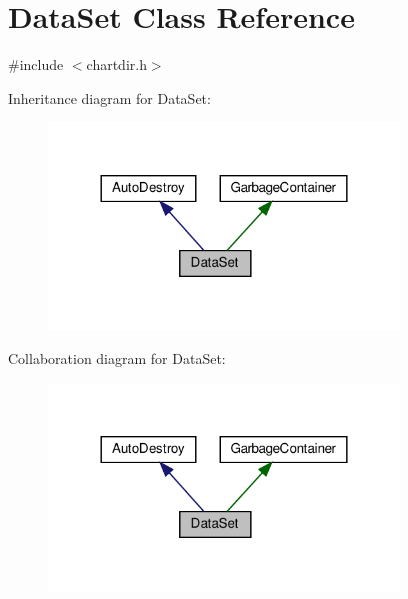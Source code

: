 \hypertarget{class_data_set}{}\section{Data\+Set Class Reference}
\label{class_data_set}


{\ttfamily \#include $<$chartdir.\+h$>$}



Inheritance diagram for Data\+Set\+:
\nopagebreak
\begin{figure}[H]
\begin{center}
\leavevmode
\includegraphics[width=264pt]{class_data_set__inherit__graph}
\end{center}
\end{figure}


Collaboration diagram for Data\+Set\+:
\nopagebreak
\begin{figure}[H]
\begin{center}
\leavevmode
\includegraphics[width=264pt]{class_data_set__coll__graph}
\end{center}
\end{figure}
